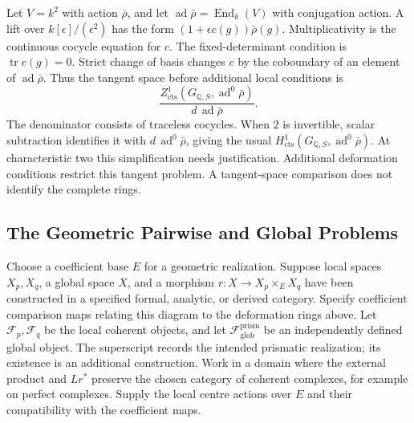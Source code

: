 \begin{remark}
\label{v4-arith:bcglue-core:rem:chenevier-tangent}
Let $V=k^2$ with action $\bar\rho$, and let
$\operatorname{ad}\bar\rho=\operatorname{End}_k(V)$ with conjugation
action. A lift over $k[\epsilon]/(\epsilon^2)$ has the form
$(1+\epsilon c(g))\bar\rho(g)$.
Multiplicativity is the continuous cocycle equation for $c$.
The fixed-determinant condition is $\operatorname{tr}c(g)=0$.
Strict change of basis changes $c$ by the coboundary of an element
of $\operatorname{ad}\bar\rho$. Thus the tangent space before
additional local conditions is
\[
 \frac{Z^1_{\mathrm{cts}}(G_{\mathbb Q,S},
                  \operatorname{ad}^0\bar\rho)}
 {d\,\operatorname{ad}\bar\rho}.
\]
The denominator consists of traceless cocycles.
When $2$ is invertible, scalar subtraction identifies it with
$d\,\operatorname{ad}^0\bar\rho$, giving the usual
$H^1_{\mathrm{cts}}(G_{\mathbb Q,S},\operatorname{ad}^0\bar\rho)$.
At characteristic two this simplification needs justification.
Additional deformation conditions restrict this tangent problem.
A tangent-space comparison does not identify the complete rings.
\end{remark}

\subsection{The Geometric Pairwise and Global Problems}

Choose a coefficient base $E$ for a geometric realization.
Suppose local spaces $X_p,X_q$, a global space $X$, and a morphism
$r:X\to X_p\times_E X_q$ have been constructed in a specified
formal, analytic, or derived category. Specify coefficient comparison
maps relating this diagram to the deformation rings above.
Let $\mathcal F_p,\mathcal F_q$ be the local coherent objects,
and let $\mathcal F_{\mathrm{glob}}^{\mathrm{prism}}$ be an
independently defined global object. The superscript records the
intended prismatic realization; its existence is an additional
construction. Work in a domain where the external product and
$Lr^*$ preserve the chosen category of coherent complexes, for
example on perfect complexes. Supply the local centre actions over
$E$ and their compatibility with the coefficient maps.

